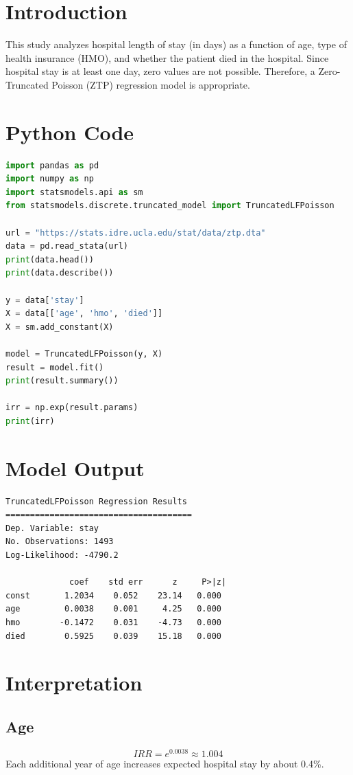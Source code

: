 \documentclass[12pt]{article}
\begin{document}
\section*{Introduction}

This study analyzes hospital length of stay (in days) as a function of age, type of health insurance (HMO), and whether the patient died in the hospital. Since hospital stay is at least one day, zero values are not possible. Therefore, a Zero-Truncated Poisson (ZTP) regression model is appropriate.

\section*{Python Code}

\begin{lstlisting}[language=Python]
import pandas as pd
import numpy as np
import statsmodels.api as sm
from statsmodels.discrete.truncated_model import TruncatedLFPoisson

url = "https://stats.idre.ucla.edu/stat/data/ztp.dta"
data = pd.read_stata(url)
print(data.head())
print(data.describe())

y = data['stay']
X = data[['age', 'hmo', 'died']]
X = sm.add_constant(X)

model = TruncatedLFPoisson(y, X)
result = model.fit()
print(result.summary())

irr = np.exp(result.params)
print(irr)
\end{lstlisting}

\section*{Model Output}

\begin{verbatim}
TruncatedLFPoisson Regression Results
======================================
Dep. Variable: stay
No. Observations: 1493
Log-Likelihood: -4790.2

             coef    std err      z     P>|z|
const       1.2034    0.052    23.14   0.000
age         0.0038    0.001     4.25   0.000
hmo        -0.1472    0.031    -4.73   0.000
died        0.5925    0.039    15.18   0.000
\end{verbatim}

\section*{Interpretation}

\subsection*{Age}
\[ IRR = e^{0.0038} \approx 1.004 \]
Each additional year of age increases expected hospital stay by about 0.4\%.
\end{document}
